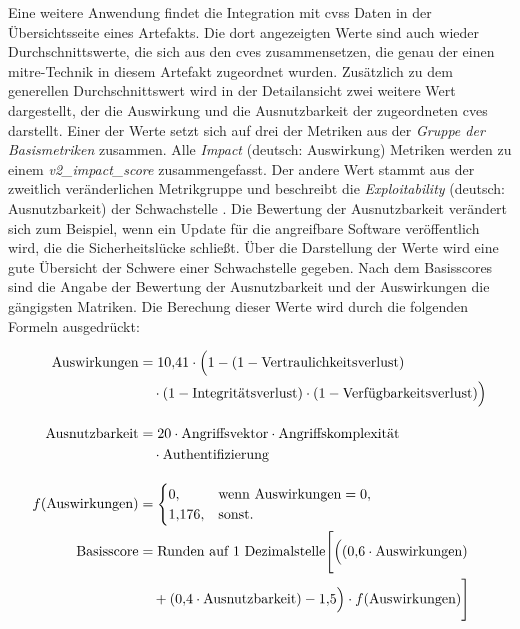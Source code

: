 \par Eine weitere Anwendung findet die Integration mit \gls{cvss} Daten in der Übersichtsseite eines Artefakts. Die dort angezeigten Werte sind auch wieder Durchschnittswerte, die sich aus den \glspl{cve} zusammensetzen, die genau der einen \gls{mitre}-Technik in diesem Artefakt zugeordnet wurden. Zusätzlich zu dem generellen Durchschnittswert wird in der Detailansicht zwei weitere Wert dargestellt, der die Auswirkung und die Ausnutzbarkeit der zugeordneten \glspl{cve} darstellt. Einer der Werte setzt sich auf drei der Metriken aus der  \textit{Gruppe der Basismetriken} zusammen. Alle \textit{Impact} (deutsch: Auswirkung) Metriken werden zu einem \textit{v2\_impact\_score} zusammengefasst. Der andere Wert stammt aus der zweitlich veränderlichen Metrikgruppe und beschreibt die \textit{Exploitability} (deutsch: Ausnutzbarkeit) der Schwachstelle \autocite{CVSSV2Complete}. Die Bewertung der Ausnutzbarkeit verändert sich zum Beispiel, wenn ein Update für die angreifbare Software veröffentlich wird, die die Sicherheitslücke schließt.
Über die Darstellung der Werte wird eine gute Übersicht der Schwere einer Schwachstelle gegeben. Nach dem Basisscores sind die Angabe der Bewertung der Ausnutzbarkeit und der Auswirkungen die gängigsten Matriken. Die Berechung dieser Werte wird durch die folgenden Formeln ausgedrückt:

\begin{align*}
    \text{Auswirkungen}    & = 10{,}41 \cdot \Big( 1
    - (1 - \text{Vertraulichkeitsverlust}) \notag                                      \\
                           & \quad \cdot (1 - \text{Integritätsverlust})
    \cdot (1 - \text{Verfügbarkeitsverlust}) \Big) \notag                              \\[10pt]
    \text{Ausnutzbarkeit}  & = 20 \cdot \text{Angriffsvektor}
    \cdot \text{Angriffskomplexität} \notag                                            \\
                           & \quad \cdot \text{Authentifizierung} \notag               \\[10pt]
    f(\text{Auswirkungen}) & =
    \begin{cases}
        0,       & \text{wenn Auswirkungen} = 0, \\
        1{,}176, & \text{sonst.}
    \end{cases}                                           \\
    \text{Basisscore}      & = \text{Runden auf 1 Dezimalstelle} \Bigg[ \Big(
    (0{,}6 \cdot \text{Auswirkungen}) \notag                                           \\
                           & \quad + (0{,}4 \cdot \text{Ausnutzbarkeit}) - 1{,}5 \Big)
    \cdot f(\text{Auswirkungen}) \Bigg] \notag                                         \\[10pt]
\end{align*}

